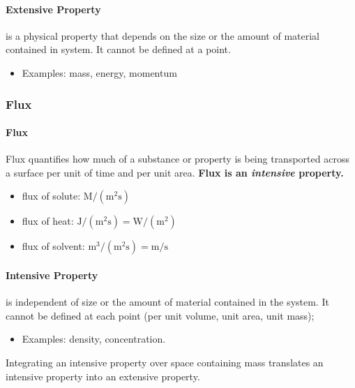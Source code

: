 \documentclass[12pt, a4paper]{article}
\numberwithin{equation}{subsection}
\begin{document}
\paragraph{Extensive Property} is a physical property that depends on the size or the amount of material contained in system. It cannot be defined at a point.
\begin{itemize}
 \item Examples: mass, energy, momentum
\end{itemize}

\subsubsection{Flux}
\paragraph{Flux} Flux quantifies how much of a substance or property is being transported across a surface per unit of time and per unit area. \textbf{Flux is an \emph{intensive} property.}

\begin{tcolorbox}[breakable, title = \textbf{Typical Units of Fluxes}]
    \begin{itemize}
        \item flux of solute: $\displaystyle \mathrm{M/(m^{2}s)}$
        \item flux of heat: $\displaystyle \mathrm{J/(m^{2}s) = W/(m^{2})}$
        \item flux of solvent: $\displaystyle \mathrm{m^{3}/(m^{2}s) = m/s}$
    \end{itemize}
\end{tcolorbox}

\paragraph{Intensive Property} is independent of size or the amount of material contained in the system. It cannot be defined at each point (per unit volume, unit area, unit mass);
\begin{itemize}
    \item Examples: density, concentration.
\end{itemize}

Integrating an intensive property over space containing mass translates an intensive property into an extensive property.
\end{document}
